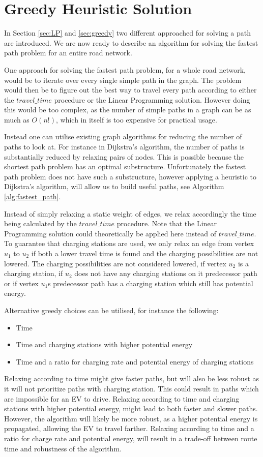\section{Greedy Heuristic Solution}\label{sec:algo}
In Section \ref{sec:LP} and \ref{sec:greedy} two different approached for solving a path are introduced. We are now ready to describe an algorithm for solving the fastest path problem for an entire road network. 

One approach for solving the fastest path problem, for a whole road network, would be to iterate over every single simple path in the graph. The problem would then be to figure out the best way to travel every path according to either the $travel\_time$ procedure or the Linear Programming solution. However doing this would be too complex, as the number of simple paths in a graph can be as much as $O(n!)$, which in itself is too expensive for practical usage.

Instead one can utilise existing graph algorithms for reducing the number of paths to look at. For instance in Dijkstra's algorithm, the number of paths is substantially reduced by relaxing pairs of nodes. This is possible because the shortest path problem has an optimal substructure. Unfortunately the fastest path problem does not have such a substructure, however applying a heuristic to Dijkstra's algorithm, will allow us to build useful paths, see Algorithm \ref{alg:fastest_path}.   

Instead of simply relaxing a static weight of edges, we relax accordingly the time being calculated by the $travel\_time$ procedure. Note that the Linear Programming solution could theoretically be applied here instead of $travel\_time$. To guarantee that charging stations are used, we only relax an edge from vertex $u_1$ to $u_2$ if both a lower travel time is found and the charging possibilities are not lowered. The charging possibilities are not considered lowered, if vertex $u_2$ is a charging station, if $u_2$ does not have any charging stations on it predecessor path or if vertex $u_1$s predecessor path has a charging station which still has potential energy.

Alternative greedy choices can be utilised, for instance the following: 
\begin{itemize}
\item Time
\item Time and charging stations with higher potential energy
\item Time and a ratio for charging rate and potential energy of charging stations
\end{itemize}
Relaxing according to time might give faster paths, but will also be less robust as it will not prioritize paths with charging station. This could result in paths which are impossible for an EV to drive. Relaxing according to time and charging stations with higher potential energy, might lead to both faster and slower paths. However, the algorithm will likely be more robust, as a higher potential energy is propagated, allowing the EV to travel farther. Relaxing according to time and a ratio for charge rate and potential energy, will result in a trade-off between route time and robustness of the algorithm.

